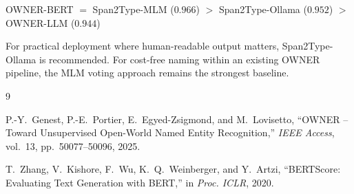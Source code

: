 \documentclass[11pt,a4paper]{article}
\begin{document}
\begin{center}
OWNER-BERT $=$ Span2Type-MLM ($0.966$)
$>$ Span2Type-Ollama ($0.952$)
$>$ OWNER-LLM ($0.944$)
\end{center}

\noindent
For practical deployment where human-readable output matters, Span2Type-Ollama
is recommended. For cost-free naming within an existing OWNER pipeline, the
MLM voting approach remains the strongest baseline.

\begin{thebibliography}{9}

P.-Y.~Genest, P.-E.~Portier, E.~Egyed-Zsigmond, and M.~Lovisetto,
``OWNER -- Toward Unsupervised Open-World Named Entity Recognition,''
\textit{IEEE Access}, vol.~13, pp.~50077--50096, 2025.

T.~Zhang, V.~Kishore, F.~Wu, K.~Q.~Weinberger, and Y.~Artzi,
``BERTScore: Evaluating Text Generation with BERT,''
in \textit{Proc. ICLR}, 2020.

\end{thebibliography}
\end{document}
